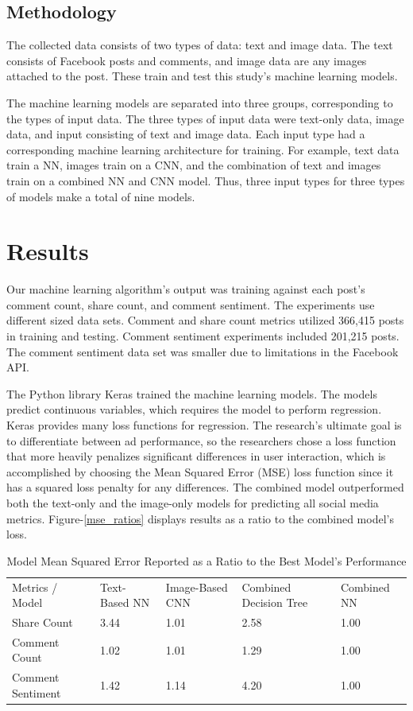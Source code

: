 \documentclass{article}
\begin{document}
\subsection{Methodology}
The collected data consists of two types of data: text and image data. The text consists of Facebook posts and comments, and image data are any images attached to the post. These train and test this study's machine learning models. 

The machine learning models are separated into three groups, corresponding to the types of input data. The three types of input data were text-only data, image data, and input consisting of text and image data. Each input type had a corresponding machine learning architecture for training. For example, text data train a NN, images train on a CNN, and the combination of text and images train on a combined NN and CNN model. Thus, three input types for three types of models make a total of nine models.

\section{Results}
Our machine learning algorithm's output was training against each post's comment count, share count, and comment sentiment. The experiments use different sized data sets.  Comment and share count metrics utilized 366,415 posts in training and testing. Comment sentiment experiments included 201,215 posts. The comment sentiment data set was smaller due to limitations in the Facebook API.

The Python library Keras trained the machine learning models. The models predict continuous variables, which requires the model to perform regression. Keras provides many loss functions for regression.  The research's ultimate goal is to differentiate between ad performance, so the researchers chose a loss function that more heavily penalizes significant differences in user interaction, which is accomplished by choosing the Mean Squared Error (MSE) loss function since it has a squared loss penalty for any differences.  The combined model outperformed both the text-only and the image-only models for predicting all social media metrics.  Figure-\ref{mse_ratios} displays results as a ratio to the combined model's loss. 

\begin{table}[]
\centering
\begin{tabular}{lllll}
Metrics / Model & Text-Based NN & Image-Based CNN & Combined Decision Tree & Combined NN \\
Share Count       & 3.44 & 1.01 & 2.58 & 1.00 \\
Comment Count     & 1.02 & 1.01 & 1.29 & 1.00 \\
Comment Sentiment & 1.42 & 1.14 & 4.20 & 1.00
\end{tabular}
\caption{\label{tab:widgets}Model Mean Squared Error Reported as a Ratio to the Best Model's Performance}
\end{table}
\end{document}
